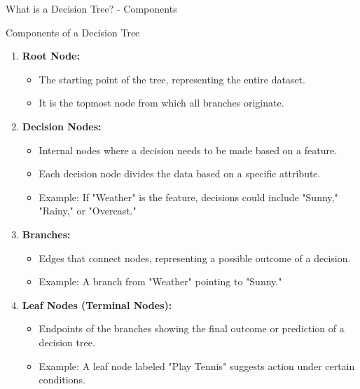 \documentclass[aspectratio=169]{beamer}
\begin{document}
\begin{frame}[fragile]{What is a Decision Tree? - Components}
    \begin{block}{Components of a Decision Tree}
        \begin{enumerate}
            \item \textbf{Root Node:}
                \begin{itemize}
                    \item The starting point of the tree, representing the entire dataset.
                    \item It is the topmost node from which all branches originate.
                \end{itemize}
                
            \item \textbf{Decision Nodes:}
                \begin{itemize}
                    \item Internal nodes where a decision needs to be made based on a feature.
                    \item Each decision node divides the data based on a specific attribute.
                    \item Example: If "Weather" is the feature, decisions could include "Sunny," "Rainy," or "Overcast."
                \end{itemize}
                
            \item \textbf{Branches:}
                \begin{itemize}
                    \item Edges that connect nodes, representing a possible outcome of a decision.
                    \item Example: A branch from "Weather" pointing to "Sunny."
                \end{itemize}
                
            \item \textbf{Leaf Nodes (Terminal Nodes):}
                \begin{itemize}
                    \item Endpoints of the branches showing the final outcome or prediction of a decision tree.
                    \item Example: A leaf node labeled "Play Tennis" suggests action under certain conditions.
                \end{itemize}
        \end{enumerate}
    \end{block}
\end{frame}
\end{document}
